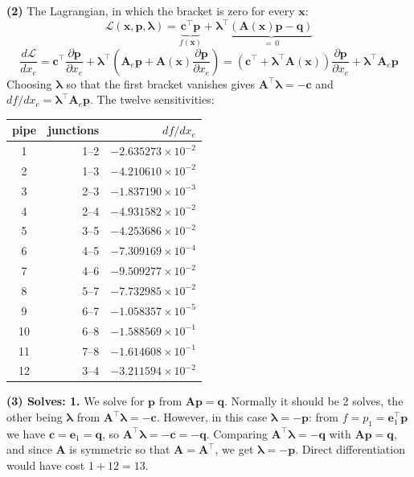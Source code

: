 \documentclass[11pt,a4paper]{article}
\begin{document}
\textbf{(2)} The Lagrangian, in which the bracket is zero for every $\bm{x}$:
\[
  \mathcal{L}(\bm{x},\bm{p},\bm{\lambda})
  = \underbrace{\bm{c}^\top\bm{p}}_{f(\bm{x})}
  + \bm{\lambda}^\top\underbrace{\left(\bm{A}(\bm{x})\bm{p}-\bm{q}\right)}_{=\,0}
\]
\[
  \frac{d\mathcal{L}}{dx_e}
  = \bm{c}^\top\frac{\partial\bm{p}}{\partial x_e}
  + \bm{\lambda}^\top\!\left(\bm{A}_e\bm{p} + \bm{A}(\bm{x})\frac{\partial\bm{p}}{\partial x_e}\right)
  = \left(\bm{c}^\top + \bm{\lambda}^\top\bm{A}(\bm{x})\right)\frac{\partial\bm{p}}{\partial x_e}
  + \bm{\lambda}^\top\bm{A}_e\bm{p}
\]
Choosing $\bm{\lambda}$ so that the first bracket vanishes gives
$\bm{A}^\top\bm{\lambda} = -\bm{c}$ and
$df/dx_e = \bm{\lambda}^\top\bm{A}_e\bm{p}$. The twelve sensitivities:

\begin{center}
\begin{tabular}{crr}
\toprule
pipe & junctions & $df/dx_e$ \\
\midrule
1  & 1--2 & $-2.635273\times10^{-2}$ \\
2  & 1--3 & $-4.210610\times10^{-2}$ \\
3  & 2--3 & $-1.837190\times10^{-3}$ \\
4  & 2--4 & $-4.931582\times10^{-2}$ \\
5  & 3--5 & $-4.253686\times10^{-2}$ \\
6  & 4--5 & $-7.309169\times10^{-4}$ \\
7  & 4--6 & $-9.509277\times10^{-2}$ \\
8  & 5--7 & $-7.732985\times10^{-2}$ \\
9  & 6--7 & $-1.058357\times10^{-5}$ \\
10 & 6--8 & $-1.588569\times10^{-1}$ \\
11 & 7--8 & $-1.614608\times10^{-1}$ \\
12 & 3--4 & $-3.211594\times10^{-2}$ \\
\bottomrule
\end{tabular}
\end{center}

\textbf{(3) Solves: 1.} We solve for $\bm{p}$ from $\bm{A}\bm{p} = \bm{q}$.
Normally it should be 2 solves, the other being $\bm{\lambda}$ from
$\bm{A}^\top\bm{\lambda} = -\bm{c}$. However, in this case
$\bm{\lambda} = -\bm{p}$: from $f = p_1 = \bm{e}_1^\top\bm{p}$ we have
$\bm{c} = \bm{e}_1 = \bm{q}$, so $\bm{A}^\top\bm{\lambda} = -\bm{c} = -\bm{q}$.
Comparing $\bm{A}^\top\bm{\lambda} = -\bm{q}$ with $\bm{A}\bm{p} = \bm{q}$, and
since $\bm{A}$ is symmetric so that $\bm{A} = \bm{A}^\top$, we get
$\bm{\lambda} = -\bm{p}$. Direct differentiation would have cost $1 + 12 = 13$.
\end{document}
